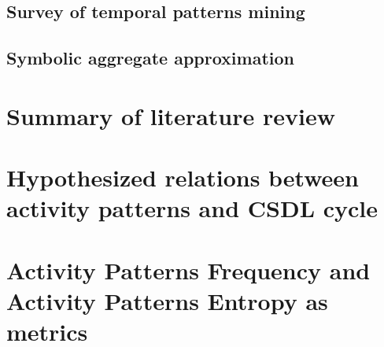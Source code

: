 \subsection{Survey of temporal patterns mining}
\subsection{Symbolic aggregate approximation}

\section{Summary of literature review}

\section{Hypothesized relations between activity patterns and CSDL cycle}

\section{Activity Patterns Frequency and Activity Patterns Entropy as metrics}